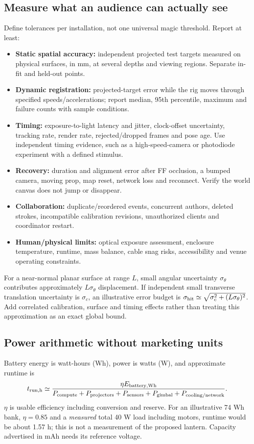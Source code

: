 \documentclass[11pt,a4paper]{article}
\begin{document}
\subsection{Measure what an audience can actually see}
Define tolerances per installation, not one universal magic threshold.
Report at least:
\begin{itemize}
  \item \textbf{Static spatial accuracy:} independent projected test targets
    measured on physical surfaces, in mm, at several depths and viewing
    regions. Separate in-fit and held-out points.
  \item \textbf{Dynamic registration:} projected-target error while the rig
    moves through specified speeds/accelerations; report median, 95th
    percentile, maximum and failure counts with sample conditions.
  \item \textbf{Timing:} exposure-to-light latency and jitter, clock-offset
    uncertainty, tracking rate, render rate, rejected/dropped frames and
    pose age. Use independent timing evidence, such as a high-speed-camera
    or photodiode experiment with a defined stimulus.
  \item \textbf{Recovery:} duration and alignment error after FF occlusion,
    a bumped camera, moving prop, map reset, network loss and reconnect.
    Verify the world canvas does not jump or disappear.
  \item \textbf{Collaboration:} duplicate/reordered events, concurrent
    authors, deleted strokes, incompatible calibration revisions,
    unauthorized clients and coordinator restart.
  \item \textbf{Human/physical limits:} optical exposure assessment,
    enclosure temperature, runtime, mass balance, cable snag risks,
    accessibility and venue operating constraints.
\end{itemize}

For a near-normal planar surface at range $L$, small angular uncertainty
$\sigma_\theta$ contributes approximately $L\sigma_\theta$ displacement.
If independent small transverse translation uncertainty is $\sigma_c$,
an illustrative error budget is
$\sigma_{\rm hit}\simeq\sqrt{\sigma_c^2+(L\sigma_\theta)^2}$.
Add correlated calibration, surface and timing effects rather than treating
this approximation as an exact global bound.

\subsection{Power arithmetic without marketing units}
Battery energy is watt-hours (Wh), power is watts (W), and approximate
runtime is
\begin{equation}
t_{\rm run,h}\simeq\frac{\eta E_{\rm battery,Wh}}
 {P_{\rm compute}+P_{\rm projectors}+P_{\rm sensors}+P_{\rm gimbal}
  +P_{\rm cooling/network}} .
\end{equation}
$\eta$ is usable efficiency including conversion and reserve.
For an illustrative 74 Wh bank, $\eta=0.85$ and a \emph{measured} total
40 W load including motors, runtime would be about 1.57 h; this is not a
measurement of the proposed lantern. Capacity advertised in mAh needs its
reference voltage.
\end{document}
